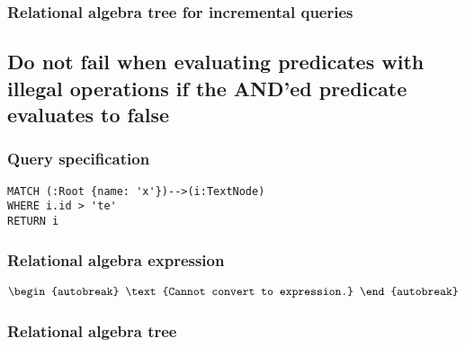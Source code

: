 \subsubsection*{Relational algebra tree for incremental queries}


\subsection{Do not fail when evaluating predicates with illegal operations if the AND'ed predicate evaluates to false}

\subsubsection*{Query specification}

\begin{lstlisting}
MATCH (:Root {name: 'x'})-->(i:TextNode)
WHERE i.id > 'te'
RETURN i
\end{lstlisting}

\subsubsection*{Relational algebra expression}

\begin{align*}
\begin{autobreak}
\text{Cannot convert to expression.}
\end{autobreak}
\end{align*}

\subsubsection*{Relational algebra tree}

